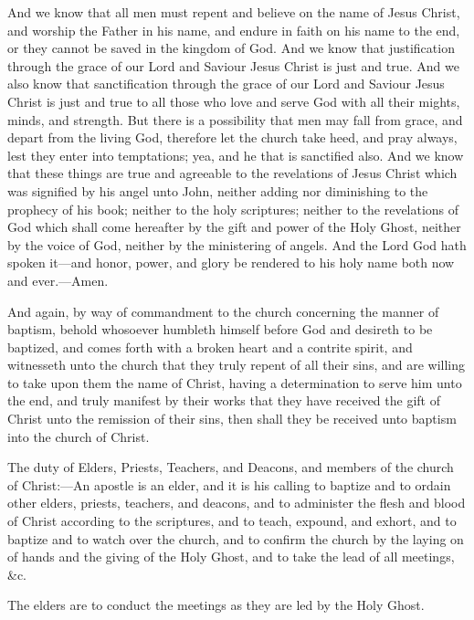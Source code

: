 				And we know that all men must repent and believe on the name of Jesus Christ, and worship the Father in his name, and endure in faith on his name to the end, or they cannot be saved in the kingdom of God. And we know that justification through the grace of our Lord and Saviour Jesus Christ is just and true. And we also know that sanctification through the grace of our Lord and Saviour Jesus Christ is just and true to all those who love and serve God with all their mights, minds, and strength. But there is a possibility that men may fall from grace, and depart from the living God, therefore let the church take heed, and pray always, lest they enter into temptations; yea, and he that is sanctified also. And we know that these things are true and agreeable to the revelations of Jesus Christ which was signified by his angel unto John, neither adding nor diminishing to the prophecy of his book; neither to the holy scriptures; neither to the revelations of God which shall come hereafter by the gift and power of the Holy Ghost, neither by the voice of God, neither by the ministering of angels. And the Lord God hath spoken it---and honor, power, and glory be rendered to his holy name both now and ever.---Amen.

				And again, by way of commandment to the church concerning the manner of baptism, behold whosoever humbleth himself before God and desireth to be baptized, and comes forth with a broken heart and a contrite spirit, and witnesseth unto the church that they truly repent of all their sins, and are willing to take upon them the name of Christ, having a determination to serve him unto the end, and truly manifest by their works that they have received the gift of Christ unto the remission of their sins, then shall they be received unto baptism into the church of Christ.

				The duty of Elders, Priests, Teachers, and Deacons, and members of the church of Christ:---An apostle is an elder, and it is his calling to baptize and to ordain other elders, priests, teachers, and deacons, and to administer the flesh and blood of Christ according to the scriptures, and to teach, expound, and exhort, and to baptize and to watch over the church, and to confirm the church by the laying on of hands and the giving of the Holy Ghost, and to take the lead of all meetings, \&c.

				The elders are to conduct the meetings as they are led by the Holy Ghost.

